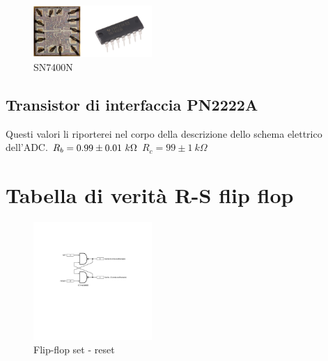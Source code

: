 \documentclass[journal]{IEEEtran}
\begin{document}
\begin{figure}[H]%
\begin{center}
\includegraphics[width=0.40\textwidth]{lab-reports/Schematics-and-graphics/SN7400N.png}
\caption{SN7400N}
\label{fig:integrated_nand}
\end{center}
\end{figure}

\subsection{Transistor di interfaccia PN2222A}






Questi valori li riporterei nel corpo della descrizione dello schema elettrico dell'ADC.
$R_b = 0.99 \pm 0.01 \ k\Omega \\$
$R_c = 99 \pm 1 \ k\Omega$





\section{Tabella di verità R-S flip flop}

\begin{figure}[H]%
\begin{center}
\includegraphics[width=0.40\textwidth]{sch-simulations/digital/output/flip-flop-RS.pdf}
\caption{Flip-flop set - reset}
\label{fig:circuit_flip_flop}
\end{center}
\end{figure}
\end{document}
